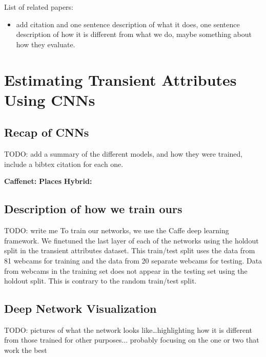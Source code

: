 \documentclass{article}
\begin{document}
List of related papers:
\begin{itemize}

  \item add citation and one sentence description of what it does, one
    sentence description of how it is different from what we do, maybe
    something about how they evaluate.

\end{itemize}

\section{Estimating Transient Attributes Using CNNs}

\subsection{Recap of CNNs}

TODO: add a summary of the different models, and how they were
trained, include a bibtex citation for each one.

\textbf{Caffenet:} \cite{caffenetnips12}
\newline\indent
\textbf{Places} \cite{zhou2014places}
\newline\indent
\textbf{Hybrid:} \cite{zhou2014places}

\subsection{Description of how we train ours}

TODO: write me\newline 
\newline\indent
To train our networks, we use the Caffe \cite{caffe14} deep learning 
framework. We finetuned the last layer of each of the networks using the 
holdout split in the transient attributes dataset.  This train/test split uses
the data from 81 webcams for training and the data from 20 separate 
webcams for testing.  Data from webcams in the training set does not
appear in the testing set using the holdout split.  This is contrary to 
the random train/test split.  

\subsection{Deep Network Visualization}

TODO: pictures of what the network looks like\dots highlighting how it
is different from those trained for other purposes... probably
focusing on the one or two that work the best
\end{document}
